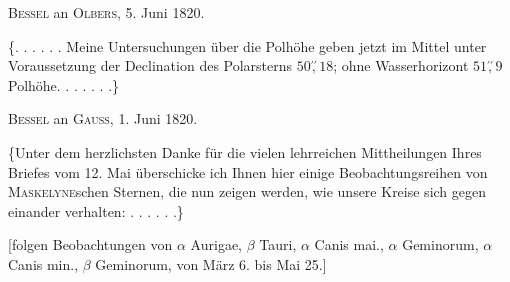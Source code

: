 \begin{center}\textsc{Bessel} an \textsc{Olbers}, 5. Juni 1820.\end{center}
\noindent\hspace*{\parindent}\{. . . . . . Meine Untersuchungen über die Polhöhe geben jetzt im Mittel unter Voraussetzung der Declination des Polarsterns \(50\overset{\prime\prime}{,}18\); ohne Wasserhorizont \(51\overset{\prime\prime}{,}9\) Polhöhe. . . . . . .\}

\begin{center}\textsc{Bessel} an \textsc{Gauss}, 1. Juni 1820.\end{center}
\noindent\hspace*{\parindent}\{Unter dem herzlichsten Danke für die vielen lehrreichen Mittheilungen Ihres Briefes vom 12. Mai überschicke ich Ihnen hier einige Beobachtungsreihen von \textsc{Maskelyne}schen Sternen, die nun zeigen werden, wie unsere Kreise sich gegen einander verhalten: . . . . . .\}

[folgen Beobachtungen von \(\alpha\) Aurigae, \(\beta\) Tauri, \(\alpha\) Canis mai., \(\alpha\) Geminorum, \(\alpha\) Canis min., \(\beta\) Geminorum, von März 6. bis Mai 25.]
\clearpage\endgroup
